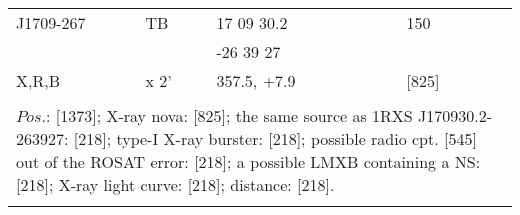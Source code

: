 \documentclass{aa}
\begin{document}
\begin{tabular}{p{2.5cm}p{1cm}p{1.8cm}p{2.3cm}p{3.3cm}p{2.0cm}p{2.2cm}}
\noalign{\smallskip}
J1709-267  & TB   & 17 09 30.2       &                    &                    & 150              &      \\
                     &          & -26 39 27         &                    &                   &                       &    \\
X,R,B          & x 2'    & 357.5, +7.9      &                    &                   & [825]             &    \\
\\
\multicolumn{7}{p{17.5cm}}{
$Pos$.: [1373]; X-ray nova: [825]; the same source as 1RXS J170930.2-263927: [218]; type-I X-ray burster: [218]; 
possible radio cpt. [545] out of the ROSAT error: [218]; a possible LMXB containing a NS: [218]; X-ray light curve: 
[218]; distance: [218].}\\
\noalign{\smallskip}
\hline

\end{tabular}
\end{document}
